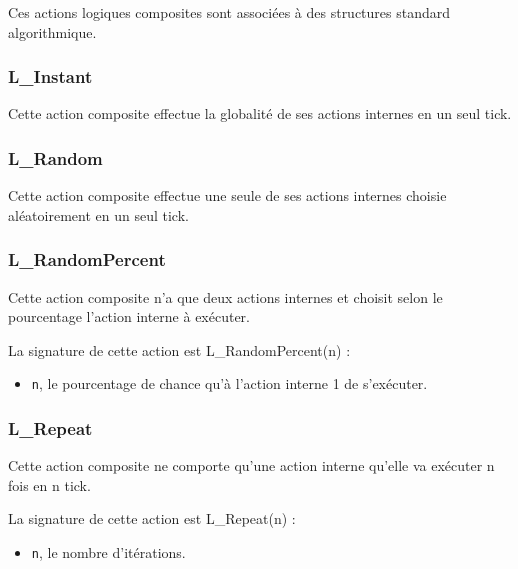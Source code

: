 Ces actions logiques composites sont associées à des structures standard algorithmique.



\subsubsection{L\_Instant}

Cette action composite effectue la globalité de ses actions internes en un seul tick.



\subsubsection{L\_Random}
Cette action composite effectue une seule de ses actions internes choisie aléatoirement en un seul tick.


\subsubsection{L\_RandomPercent}

Cette action composite n'a que deux actions internes et choisit selon le pourcentage l'action interne à exécuter.

La signature de cette action est L\_RandomPercent(n) :
\begin{itemize}
	\item \texttt{n},  le pourcentage de chance qu'à l'action interne 1 de s'exécuter.
	\end{itemize}	
	
\subsubsection{L\_Repeat}
Cette action composite ne comporte qu'une action interne qu'elle va exécuter n fois en n tick.

La signature de cette action est L\_Repeat(n) :
\begin{itemize}
	\item \texttt{n},  le nombre d'itérations.
	\end{itemize}	
